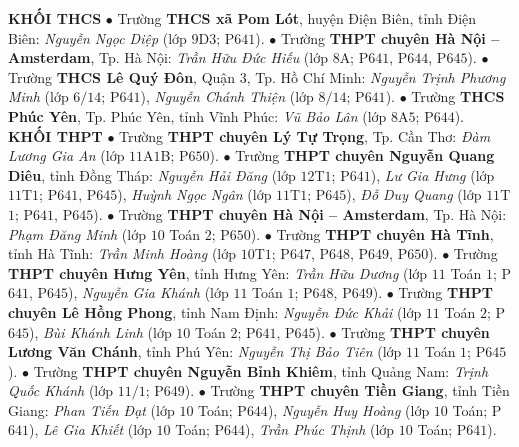 \begin{multicols}{2}
	\textbf{\color{thachthuctoanhoc}KHỐI THCS}
	\vskip 0.1cm
	$\bullet$ Trường \textbf{\color{thachthuctoanhoc}THCS xã Pom Lót}, huyện Điện Biên, tỉnh Điện Biên: \textit{Nguyễn Ngọc Diệp} (lớp $9$D$3$; P$641$).
	\vskip 0.1cm
	$\bullet$ Trường \textbf{\color{thachthuctoanhoc}THPT chuyên Hà Nội -- Amsterdam}, Tp. Hà Nội: \textit{Trần Hữu Đức Hiếu} (lớp $8$A; P$641$, P$644$, P$645$).
	\vskip 0.1cm
	$\bullet$ Trường \textbf{\color{thachthuctoanhoc}THCS Lê Quý Đôn}, Quận $3$, Tp. Hồ Chí Minh: \textit{Nguyễn Trịnh Phương Minh} (lớp $6/14$; P$641$), \textit{Nguyễn Chánh Thiện} (lớp $8/14$; P$641$).
	\vskip 0.1cm
	$\bullet$ Trường \textbf{\color{thachthuctoanhoc}THCS Phúc Yên}, Tp. Phúc Yên, tỉnh Vĩnh Phúc: \textit{Vũ Bảo Lân} (lớp $8$A$5$; P$644$).
	\vskip 0.2cm
	\textbf{\color{thachthuctoanhoc}KHỐI THPT}
	\vskip 0.2cm
	$\bullet$ Trường \textbf{\color{thachthuctoanhoc}THPT chuyên Lý Tự Trọng}, Tp. Cần Thơ: \textit{Đàm Lương Gia An} (lớp $11$A$1$B; P$650$).
	\vskip 0.1cm
	$\bullet$ Trường \textbf{\color{thachthuctoanhoc}THPT chuyên Nguyễn Quang Diêu}, tỉnh Đồng Tháp: \textit{Nguyễn Hải Đăng} (lớp $12$T$1$; P$641$),  \textit{Lư Gia Hưng} (lớp $11$T$1$; P$641$, P$645$), \textit{Huỳnh Ngọc Ngân} (lớp $11$T$1$; P$645$), \textit{Đỗ Duy Quang} (lớp $11$T$1$; P$641$, P$645$).
	\vskip 0.1cm
	$\bullet$ Trường \textbf{\color{thachthuctoanhoc}THPT chuyên Hà Nội -- Amsterdam}, Tp. Hà Nội: \textit{Phạm Đăng Minh} (lớp $10$ Toán $2$; P$650$).
	\vskip 0.1cm
	$\bullet$ Trường \textbf{\color{thachthuctoanhoc}THPT chuyên Hà Tĩnh}, tỉnh Hà Tĩnh: \textit{Trần Minh Hoàng} (lớp $10$T$1$; P$647$, P$648$, P$649$, P$650$).
	\vskip 0.1cm
	$\bullet$ Trường \textbf{\color{thachthuctoanhoc}THPT chuyên Hưng Yên}, tỉnh Hưng Yên: \textit{Trần Hữu Dương} (lớp $11$ Toán $1$; P$641$, P$645$), \textit{Nguyễn Gia Khánh} (lớp $11$ Toán $1$; P$648$, P$649$).
	\vskip 0.1cm
	$\bullet$ Trường \textbf{\color{thachthuctoanhoc}THPT chuyên Lê Hồng Phong}, tỉnh Nam Định: \textit{Nguyễn Đức Khải} (lớp $11$ Toán $2$; P$645$), \textit{Bùi Khánh Linh} (lớp $10$ Toán $2$; P$641$, P$645$).
	\vskip 0.1cm
	$\bullet$ Trường \textbf{\color{thachthuctoanhoc}THPT chuyên Lương Văn Chánh}, tỉnh Phú Yên: \textit{Nguyễn Thị Bảo Tiên} (lớp $11$ Toán $1$; P$645$).
	\vskip 0.1cm
	$\bullet$ Trường \textbf{\color{thachthuctoanhoc}THPT chuyên Nguyễn Bỉnh Khiêm}, tỉnh Quảng Nam: \textit{Trịnh Quốc Khánh} (lớp $11/1$; P$649$).
	\vskip 0.1cm
	$\bullet$ Trường \textbf{\color{thachthuctoanhoc}THPT chuyên Tiền Giang}, tỉnh Tiền Giang: \textit{Phan Tiến Đạt} (lớp $10$ Toán; P$644$), \textit{Nguyễn Huy Hoàng} (lớp $10$ Toán; P$641$), \textit{Lê Gia Khiết} (lớp $10$ Toán; P$644$), \textit{Trần Phúc Thịnh} (lớp $10$ Toán; P$641$).

\end{multicols}
